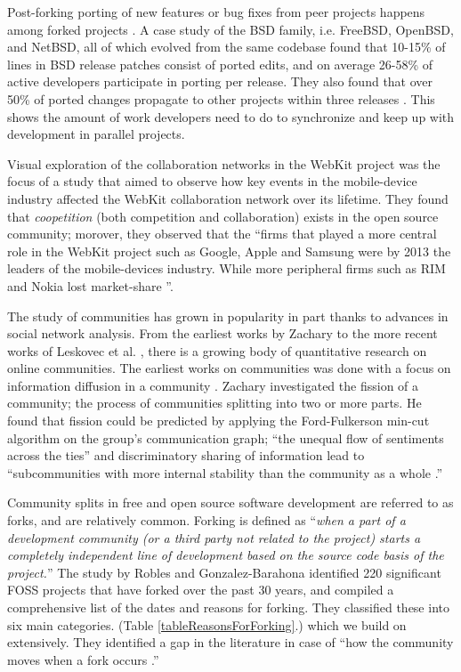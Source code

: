 \documentclass{acm_proc_article-sp}
\begin{document}
Post-forking porting of new features or bug fixes from peer projects happens among forked projects \cite{Baishakhi}. A case study of the BSD family, i.e. FreeBSD, OpenBSD, and NetBSD, all of which evolved from the same codebase found that 10-15\% of lines in BSD release patches consist of ported edits, and on average 26-58\% of active developers participate in porting per release. They also found that over 50\% of ported changes propagate to other projects within three releases \cite{Baishakhi}. This shows the amount of work developers need to do to synchronize and keep up with development in parallel projects. 

Visual exploration of the collaboration networks in the WebKit project was the focus of a study that aimed to observe how key events in the mobile-device industry affected the WebKit collaboration network over its lifetime. \cite{JoseWebKit} They found that \textit{coopetition} (both competition and collaboration) exists in the open source community; morover, they observed that the ``firms that played a more central role in the WebKit project such as Google, Apple and Samsung were by 2013 the leaders of the mobile-devices industry. While more peripheral firms such as RIM and Nokia lost market-share \cite{JoseWebKit}''.

The study of communities has grown in popularity in part thanks to advances in social network analysis.  From the earliest works by Zachary \cite{Zachary} to the more recent works of Leskovec et al. \cite{LeskovecGraphsOverTime}\cite{LeskovecStatisticalPropertiesOfCommunityStructure}, there is a growing body of quantitative research on online communities. The earliest works on communities was done with a focus on information diffusion in a community \cite{Zachary}. Zachary investigated the fission of a community; the process of communities splitting into two or more parts. He found that fission could be predicted by applying the Ford-Fulkerson min-cut algorithm \cite{Ford} on the group's communication graph; ``the unequal flow of sentiments across the ties'' and discriminatory sharing of information lead to ``subcommunities with more internal stability than the community as a whole \cite{Zachary}.''

Community splits in free and open source software development are referred to as forks, and are relatively common. Forking is defined as ``\textit{when a part of a development community (or a third party not related to the project) starts a completely independent line of development based on the source code basis of the project.}'' The study by Robles and Gonzalez-Barahona \cite{Robles} identified 220 significant FOSS projects that have forked over the past 30 years, and compiled a comprehensive list of the dates and reasons for forking. They classified these into six main categories. (Table \ref{tableReasonsForForking}.) which we build on extensively. They identified a gap in the literature in case of ``how the community moves when a fork occurs \cite{Robles}.''
\end{document}
